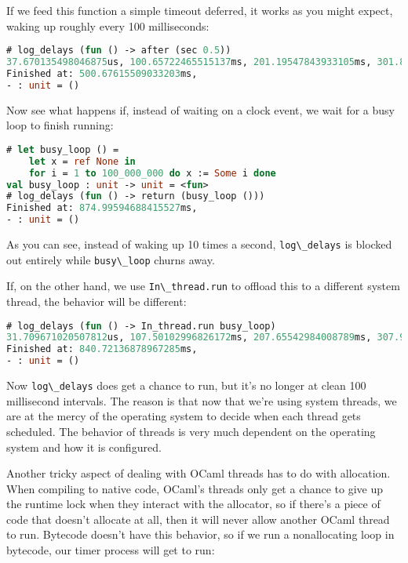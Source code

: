 If we feed this function a simple timeout deferred, it works as you
might expect, waking up roughly every 100 milliseconds:

\begin{lstlisting}[language=Caml]
# log_delays (fun () -> after (sec 0.5))
37.670135498046875us, 100.65722465515137ms, 201.19547843933105ms, 301.85389518737793ms, 402.58693695068359ms,
Finished at: 500.67615509033203ms,
- : unit = ()
\end{lstlisting}

Now see what happens if, instead of waiting on a clock event, we wait
for a busy loop to finish running:

\begin{lstlisting}[language=Caml]
# let busy_loop () =
    let x = ref None in
    for i = 1 to 100_000_000 do x := Some i done
val busy_loop : unit -> unit = <fun>
# log_delays (fun () -> return (busy_loop ()))
Finished at: 874.99594688415527ms,
- : unit = ()
\end{lstlisting}

As you can see, instead of waking up 10 times a second,
\passthrough{\lstinline!log\_delays!} is blocked out entirely while
\passthrough{\lstinline!busy\_loop!} churns away.

If, on the other hand, we use \passthrough{\lstinline!In\_thread.run!}
to offload this to a different system thread, the behavior will be
different:

\begin{lstlisting}[language=Caml]
# log_delays (fun () -> In_thread.run busy_loop)
31.709671020507812us, 107.50102996826172ms, 207.65542984008789ms, 307.95812606811523ms, 458.15873146057129ms, 608.44659805297852ms, 708.55593681335449ms, 808.81166458129883ms,
Finished at: 840.72136878967285ms,
- : unit = ()
\end{lstlisting}

Now \passthrough{\lstinline!log\_delays!} does get a chance to run, but
it's no longer at clean 100 millisecond intervals. The reason is that
now that we're using system threads, we are at the mercy of the
operating system to decide when each thread gets scheduled. The behavior
of threads is very much dependent on the operating system and how it is
configured.

Another tricky aspect of dealing with OCaml threads has to do with
allocation. When compiling to native code, OCaml's threads only get a
chance to give up the runtime lock when they interact with the
allocator, so if there's a piece of code that doesn't allocate at all,
then it will never allow another OCaml thread to run. Bytecode doesn't
have this behavior, so if we run a nonallocating loop in bytecode, our
timer process will get to run:

